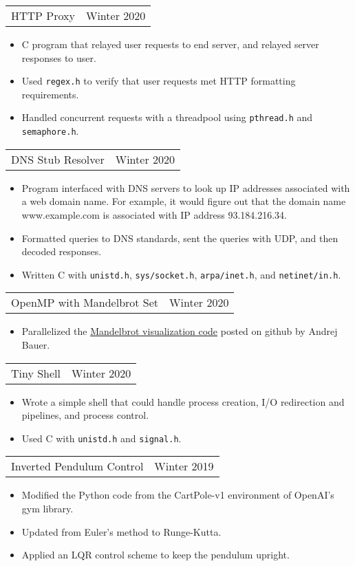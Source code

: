 \documentclass{article}
\newenvironment{compactItemize}{
  \begin{itemize}[itemsep=0ex, parsep=0ex, partopsep=0ex, topsep= -7pt]
}{
  \end{itemize}
}
\newcommand{\project}[2]{
  \begingroup
  \setlength{\tabcolsep}{0ex}
  \begin{tabularx}{\linewidth}{X r}
    #1 & %
    #2\\ %
  \end{tabularx}%
  \endgroup%
}
\begin{document}
\project{HTTP Proxy}{Winter 2020}
\begin{compactItemize}
  \item C program that relayed user requests to end server, and relayed server responses to user.
  \item Used \texttt{regex.h} to verify that user requests met HTTP formatting requirements.
  \item Handled concurrent requests with a threadpool using \texttt{pthread.h} and \texttt{semaphore.h}.
\end{compactItemize}
\medskip

\project{DNS Stub Resolver}{Winter 2020}
\begin{compactItemize}
  \item Program interfaced with DNS servers to look up IP addresses associated with a web domain name.
        For example, it would figure out that the domain name www.example.com is associated with IP address 93.184.216.34.
  \item Formatted queries to DNS standards, sent the queries with UDP, and then decoded responses.
  \item Written C with \texttt{unistd.h}, \texttt{sys/socket.h}, \texttt{arpa/inet.h}, and \texttt{netinet/in.h}.
\end{compactItemize}
\medskip

\project{OpenMP with Mandelbrot Set}{Winter 2020}
\begin{compactItemize}
  \item Parallelized the \href{https://gist.github.com/andrejbauer/7919569}{Mandelbrot visualization code} posted on github by Andrej Bauer.
\end{compactItemize}
\medskip

\project{Tiny Shell}{Winter 2020}
\begin{compactItemize}
  \item Wrote a simple shell that could handle process creation, I/O redirection and pipelines, and process control.
  \item Used C with \texttt{unistd.h} and \texttt{signal.h}.
\end{compactItemize}
\medskip

\project{Inverted Pendulum Control}{Winter 2019}
\begin{compactItemize}
  \item Modified the Python code from the CartPole-v1 environment of OpenAI's gym library.
  \item Updated from Euler's method to Runge-Kutta.
  \item Applied an LQR control scheme to keep the pendulum upright.
\end{compactItemize}
\medskip
\end{document}

